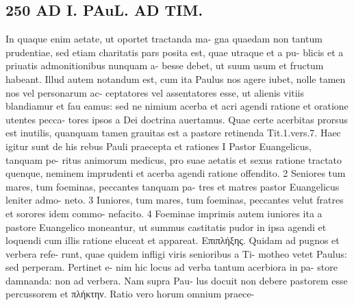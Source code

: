 \documentclass{article}
\begin{document}
\begin{pages}
\section*{250 AD I. PAuL. AD TIM. }In quaque enim aetate, ut oportet tractanda ma- gna quaedam non tantum prudentiae, sed etiam charitatis pars posita est, quae utraque et a pu- blicis et a priuatis admonitionibus nunquam a- besse debet, ut suum usum et fructum habeant. Illud autem notandum est, cum ita Paulus nos agere iubet, nolle tamen nos vel personarum ac- ceptatores vel assentatores esse, ut alienis vitiis blandiamur et fau eamus: sed ne nimium acerba et acri agendi ratione et oratione utentes pecca- tores ipsos a Dei doctrina auertamus. Quae certe acerbitas prorsus est inutilis, quanquam tamen grauitas est a pastore retinenda Tit.1.vers.7. Haec igitur sunt de his rebus Pauli praecepta et rationes I Pastor Euangelicus, tanquam pe- ritus animorum medicus, pro suae aetatis et sexus ratione tractato quenque, neminem imprudenti et acerba agendi ratione offendito. 2 Seniores tum mares, tum foeminas, peccantes tanquam pa- tres et matres pastor Euangelicus leniter admo- neto. 3 Iuniores, tum mares, tum foeminas, peccantes velut fratres et sorores idem commo- nefacito. 4 Foeminae imprimis autem iuniores ita a pastore Euangelico moneantur, ut summus castitatis pudor in ipsa agendi et loquendi cum illis ratione eluceat et appareat. Επιπλήξης. Quidam ad pugnos et verbera refe- runt, quae quidem infligi viris senioribus a Ti- motheo vetet Paulus: sed perperam. Pertinet e- nim hic locus ad verba tantum acerbiora in pa- store damnanda: non ad verbera. Nam supra Pau- lus docuit non debere pastorem esse percussorem et πλήκτην. Ratio vero horum omnium praece- 

\end{pages}
\end{document}
